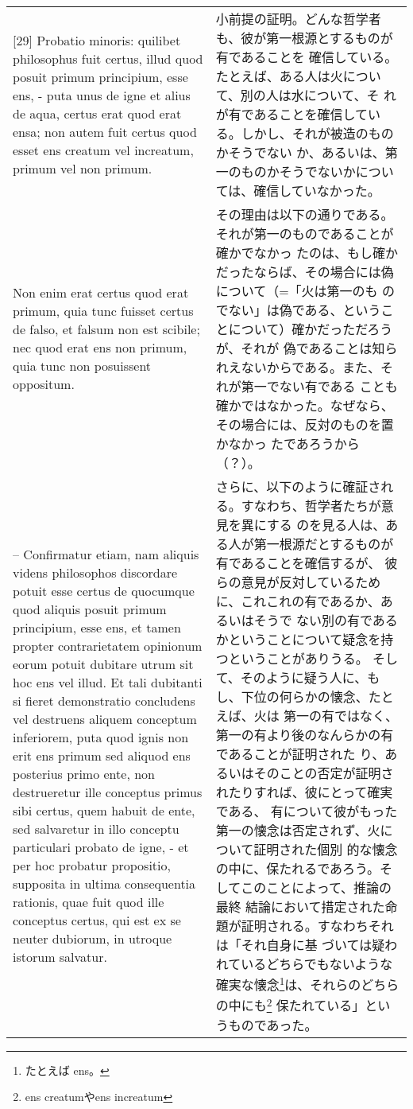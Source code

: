 \documentclass[paper=a4paper,fontsize=10pt,jafontsize=9pt,titlepage]{jlreq}
\begin{document}
\begin{longtable}{p{21em}p{21em}}
 \\

[29] Probatio minoris: quilibet philosophus fuit certus, illud quod
posuit primum principium, esse ens, - puta unus de igne et alius de
aqua, certus erat quod erat ensa; non autem fuit certus quod esset ens
creatum vel increatum, primum vel non primum.

 &

 小前提の証明。どんな哲学者も、彼が第一根源とするものが有であることを
 確信している。たとえば、ある人は火について、別の人は水について、そ
 れが有であることを確信している。しかし、それが被造のものかそうでない
 か、あるいは、第一のものかそうでないかについては、確信していなかった。

 \\

 
 Non enim erat certus quod erat primum, quia tunc fuisset certus de
falso, et falsum non est scibile; nec quod erat ens non primum, quia
tunc non posuissent oppositum.

&

 その理由は以下の通りである。それが第一のものであることが確かでなかっ
 たのは、もし確かだったならば、その場合には偽について（=「火は第一のも
 のでない」は偽である、ということについて）確かだっただろうが、それが
 偽であることは知られえないからである。また、それが第一でない有である
 ことも確かではなかった。なぜなら、その場合には、反対のものを置かなかっ
 たであろうから（？）。

 \\

 -- Confirmatur etiam, nam aliquis videns philosophos
discordare potuit esse certus de quocumque quod aliquis posuit primum
principium, esse ens, et tamen propter contrarietatem opinionum eorum
potuit dubitare utrum sit hoc ens vel illud. Et tali dubitanti si
fieret demonstratio concludens vel destruens aliquem conceptum
inferiorem, puta quod ignis non erit ens primum sed aliquod ens
posterius primo ente, non destrueretur ille conceptus primus sibi
certus, quem habuit de ente, sed salvaretur in illo conceptu
particulari probato de igne, - et per hoc probatur propositio,
supposita in ultima consequentia rationis, quae fuit quod ille
conceptus certus, qui est ex se neuter dubiorum, in utroque istorum
salvatur.

 &

 さらに、以下のように確証される。すなわち、哲学者たちが意見を異にする
 のを見る人は、ある人が第一根源だとするものが有であることを確信するが、
 彼らの意見が反対しているために、これこれの有であるか、あるいはそうで
 ない別の有であるかということについて疑念を持つということがありうる。
 そして、そのように疑う人に、もし、下位の何らかの懐念、たとえば、火は
 第一の有ではなく、第一の有より後のなんらかの有であることが証明された
 り、あるいはそのことの否定が証明されたりすれば、彼にとって確実である、
 有について彼がもった第一の懐念は否定されず、火について証明された個別
 的な懐念の中に、保たれるであろう。そしてこのことによって、推論の最終
 結論において措定された命題が証明される。すなわちそれは「それ自身に基
 づいては疑われているどちらでもないような確実な懐念\footnote{たとえば
 ens。}は、それらのどちらの中にも\footnote{ens creatumやens increatum}
 保たれている」というものであった。
 

\end{longtable}
\end{document}
